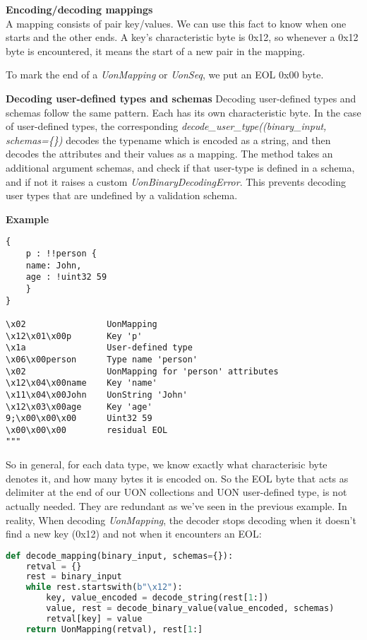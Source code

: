 \documentclass[12pt]{article}
\begin{document}
\textbf{Encoding/decoding mappings} \\
A mapping consists of pair key/values. We can use this fact to know when one starts and the other ends. A key's characteristic byte is 0x12, so whenever a 0x12 byte is encountered, it means the start of a new pair in the mapping. 

To mark the end of a \emph{UonMapping} or \emph{UonSeq}, we put an EOL 0x00 byte.

\textbf{Decoding user-defined types and schemas}
Decoding user-defined types and schemas follow the same pattern. Each has its own characteristic byte. In the case of user-defined types, the corresponding \emph{decode\_user\_type((binary\_input, schemas=\{\})} decodes the typename which is encoded as a string, and then decodes the attributes and their values as a mapping. The method takes an additional argument schemas, and check if that user-type is defined in a schema, and if not it raises a custom \emph{UonBinaryDecodingError}. This prevents decoding user types that are undefined by a validation schema.

\pagebreak

\textbf{Example} 
\begin{lstlisting}
{
    p : !!person {
    name: John,
    age : !uint32 59
    }
}

\x02                UonMapping
\x12\x01\x00p       Key 'p'
\x1a                User-defined type
\x06\x00person      Type name 'person'
\x02                UonMapping for 'person' attributes
\x12\x04\x00name    Key 'name'
\x11\x04\x00John    UonString 'John'
\x12\x03\x00age     Key 'age'
9;\x00\x00\x00      Uint32 59
\x00\x00\x00        residual EOL
"""
\end{lstlisting}

So in general, for each data type, we know exactly what characterisic byte denotes it, and how many bytes it is encoded on. So the EOL byte that acts as delimiter at the end of our UON collections and UON user-defined type, is not actually needed. They are redundant as we've seen in the previous example. In reality, When decoding \emph{UonMapping}, the decoder stops decoding when it doesn't find a new key (0x12) and not when it encounters an EOL:

\begin{lstlisting}[language=Python]
def decode_mapping(binary_input, schemas={}):
    retval = {}
    rest = binary_input
    while rest.startswith(b"\x12"):
        key, value_encoded = decode_string(rest[1:])
        value, rest = decode_binary_value(value_encoded, schemas)
        retval[key] = value
    return UonMapping(retval), rest[1:]
\end{lstlisting}
\end{document}
